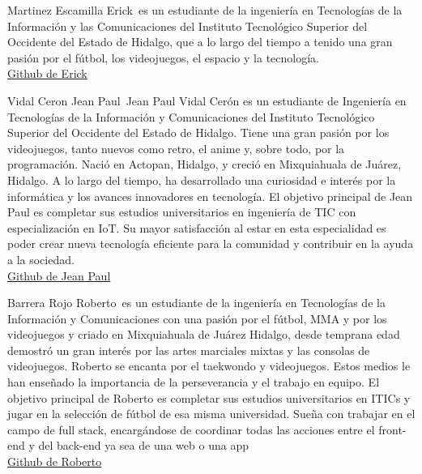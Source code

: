 \documentclass{IEEEcsmag}
\begin{document}
\begin{IEEEbiography}{Martinez Escamilla Erick}{\,} es un estudiante de la ingeniería en Tecnologías de la Información y las Comunicaciones del Instituto Tecnológico Superior del Occidente del Estado de Hidalgo, que a lo largo del tiempo a tenido una gran pasión por el fútbol, los videojuegos, el espacio y la tecnología.\\
\href{https://github.com/ErickEsca}{Github de Erick}
\end{IEEEbiography}

\begin{IEEEbiography}{Vidal Ceron Jean Paul}{\,} Jean Paul Vidal Cerón es un estudiante de Ingeniería en Tecnologías de la Información y Comunicaciones del Instituto Tecnológico Superior del Occidente del Estado de Hidalgo. Tiene una gran pasión por los videojuegos, tanto nuevos como retro, el anime y, sobre todo, por la programación. Nació en Actopan, Hidalgo, y creció en Mixquiahuala de Juárez, Hidalgo. A lo largo del tiempo, ha desarrollado una curiosidad e interés por la informática y los avances innovadores en tecnología.
El objetivo principal de Jean Paul es completar sus estudios universitarios en ingeniería de TIC con especialización en IoT. Su mayor satisfacción al estar en esta especialidad es poder crear nueva tecnología eficiente para la comunidad y contribuir en la ayuda a la sociedad.\\
\href{https://github.com/JeanPaulVidal}{Github de Jean Paul}
\end{IEEEbiography}

\begin{IEEEbiography}{Barrera Rojo Roberto}{\,} es un estudiante de la ingeniería en Tecnologías de la Información y Comunicaciones con una pasión por el fútbol, MMA y por los videojuegos y criado en Mixquiahuala de Juárez Hidalgo, desde temprana edad demostró un gran interés por las artes marciales mixtas y las consolas de videojuegos. Roberto se encanta por el taekwondo y videojuegos. Estos medios le han enseñado la importancia de la perseverancia y el trabajo en equipo. El objetivo principal de Roberto es completar sus estudios universitarios en ITICs y jugar en la selección de fútbol de esa misma universidad. Sueña con trabajar en el campo de full stack, encargándose de coordinar todas las acciones entre el front-end y del back-end ya sea de una web o una app\\
\href{https://github.com/RobertoBarreraa}{Github de Roberto}
\end{IEEEbiography}
\end{document}
